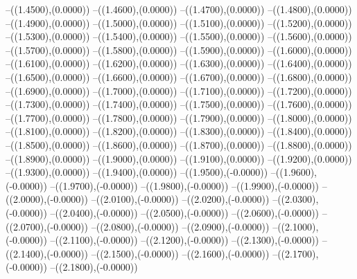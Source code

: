 {	--({\sx*(1.4500)},{\sy*(0.0000)})
	--({\sx*(1.4600)},{\sy*(0.0000)})
	--({\sx*(1.4700)},{\sy*(0.0000)})
	--({\sx*(1.4800)},{\sy*(0.0000)})
	--({\sx*(1.4900)},{\sy*(0.0000)})
	--({\sx*(1.5000)},{\sy*(0.0000)})
	--({\sx*(1.5100)},{\sy*(0.0000)})
	--({\sx*(1.5200)},{\sy*(0.0000)})
	--({\sx*(1.5300)},{\sy*(0.0000)})
	--({\sx*(1.5400)},{\sy*(0.0000)})
	--({\sx*(1.5500)},{\sy*(0.0000)})
	--({\sx*(1.5600)},{\sy*(0.0000)})
	--({\sx*(1.5700)},{\sy*(0.0000)})
	--({\sx*(1.5800)},{\sy*(0.0000)})
	--({\sx*(1.5900)},{\sy*(0.0000)})
	--({\sx*(1.6000)},{\sy*(0.0000)})
	--({\sx*(1.6100)},{\sy*(0.0000)})
	--({\sx*(1.6200)},{\sy*(0.0000)})
	--({\sx*(1.6300)},{\sy*(0.0000)})
	--({\sx*(1.6400)},{\sy*(0.0000)})
	--({\sx*(1.6500)},{\sy*(0.0000)})
	--({\sx*(1.6600)},{\sy*(0.0000)})
	--({\sx*(1.6700)},{\sy*(0.0000)})
	--({\sx*(1.6800)},{\sy*(0.0000)})
	--({\sx*(1.6900)},{\sy*(0.0000)})
	--({\sx*(1.7000)},{\sy*(0.0000)})
	--({\sx*(1.7100)},{\sy*(0.0000)})
	--({\sx*(1.7200)},{\sy*(0.0000)})
	--({\sx*(1.7300)},{\sy*(0.0000)})
	--({\sx*(1.7400)},{\sy*(0.0000)})
	--({\sx*(1.7500)},{\sy*(0.0000)})
	--({\sx*(1.7600)},{\sy*(0.0000)})
	--({\sx*(1.7700)},{\sy*(0.0000)})
	--({\sx*(1.7800)},{\sy*(0.0000)})
	--({\sx*(1.7900)},{\sy*(0.0000)})
	--({\sx*(1.8000)},{\sy*(0.0000)})
	--({\sx*(1.8100)},{\sy*(0.0000)})
	--({\sx*(1.8200)},{\sy*(0.0000)})
	--({\sx*(1.8300)},{\sy*(0.0000)})
	--({\sx*(1.8400)},{\sy*(0.0000)})
	--({\sx*(1.8500)},{\sy*(0.0000)})
	--({\sx*(1.8600)},{\sy*(0.0000)})
	--({\sx*(1.8700)},{\sy*(0.0000)})
	--({\sx*(1.8800)},{\sy*(0.0000)})
	--({\sx*(1.8900)},{\sy*(0.0000)})
	--({\sx*(1.9000)},{\sy*(0.0000)})
	--({\sx*(1.9100)},{\sy*(0.0000)})
	--({\sx*(1.9200)},{\sy*(0.0000)})
	--({\sx*(1.9300)},{\sy*(0.0000)})
	--({\sx*(1.9400)},{\sy*(0.0000)})
	--({\sx*(1.9500)},{\sy*(-0.0000)})
	--({\sx*(1.9600)},{\sy*(-0.0000)})
	--({\sx*(1.9700)},{\sy*(-0.0000)})
	--({\sx*(1.9800)},{\sy*(-0.0000)})
	--({\sx*(1.9900)},{\sy*(-0.0000)})
	--({\sx*(2.0000)},{\sy*(-0.0000)})
	--({\sx*(2.0100)},{\sy*(-0.0000)})
	--({\sx*(2.0200)},{\sy*(-0.0000)})
	--({\sx*(2.0300)},{\sy*(-0.0000)})
	--({\sx*(2.0400)},{\sy*(-0.0000)})
	--({\sx*(2.0500)},{\sy*(-0.0000)})
	--({\sx*(2.0600)},{\sy*(-0.0000)})
	--({\sx*(2.0700)},{\sy*(-0.0000)})
	--({\sx*(2.0800)},{\sy*(-0.0000)})
	--({\sx*(2.0900)},{\sy*(-0.0000)})
	--({\sx*(2.1000)},{\sy*(-0.0000)})
	--({\sx*(2.1100)},{\sy*(-0.0000)})
	--({\sx*(2.1200)},{\sy*(-0.0000)})
	--({\sx*(2.1300)},{\sy*(-0.0000)})
	--({\sx*(2.1400)},{\sy*(-0.0000)})
	--({\sx*(2.1500)},{\sy*(-0.0000)})
	--({\sx*(2.1600)},{\sy*(-0.0000)})
	--({\sx*(2.1700)},{\sy*(-0.0000)})
	--({\sx*(2.1800)},{\sy*(-0.0000)})
}
